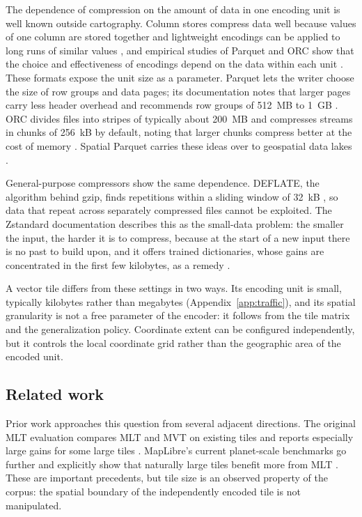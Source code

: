 The dependence of compression on the amount of data in one encoding unit is well known
outside cartography. Column stores compress data well because values of one column are
stored together and lightweight encodings can be applied to long runs of similar values
\citep{abadi2006compression}, and empirical studies of Parquet and ORC show that the
choice and effectiveness of encodings depend on the data within each unit
\citep{zeng2023columnar, kuschewski2023btrblocks}. These formats expose the unit size as a
parameter. Parquet lets the writer choose the size of row groups and data pages; its
documentation notes that larger pages carry less header overhead and recommends row
groups of 512~MB to 1~GB \citep{parquet_configurations}. ORC divides files into stripes of
typically about 200~MB and compresses streams in chunks of 256~kB by default, noting that
larger chunks compress better at the cost of memory \citep{orc_spec_v1}. Spatial Parquet
carries these ideas over to geospatial data lakes \citep{saeedan2022spatialparquet}.

General-purpose compressors show the same dependence. DEFLATE, the algorithm behind gzip,
finds repetitions within a sliding window of 32~kB \citep{rfc1951, rfc1952}, so data that
repeat across separately compressed files cannot be exploited. The Zstandard
documentation describes this as the small-data problem: the smaller the input, the
harder it is to compress, because at the start of a new input there is no past to build
upon, and it offers trained dictionaries, whose gains are concentrated in the first few
kilobytes, as a remedy \citep{zstd_readme}.

A vector tile differs from these settings in two ways. Its encoding unit is small,
typically kilobytes rather than megabytes (Appendix~\ref{app:traffic}), and its spatial
granularity is not a free parameter of the encoder: it follows from the tile matrix and
the generalization policy. Coordinate extent can be configured independently, but it
controls the local coordinate grid rather than the geographic area of the encoded unit.

\subsection{Related work}
\label{sec:bg-related}

Prior work approaches this question from several adjacent directions. The original MLT
evaluation compares MLT and MVT on existing tiles and reports especially large gains for
some large tiles \citep{tremmel2025mlt}. MapLibre's current planet-scale benchmarks go
further and explicitly show that naturally large tiles benefit more from MLT
\citep{maplibre_mlt_benchmarks}. These are important precedents, but tile size is an
observed property of the corpus: the spatial boundary of the independently encoded tile
is not manipulated.

